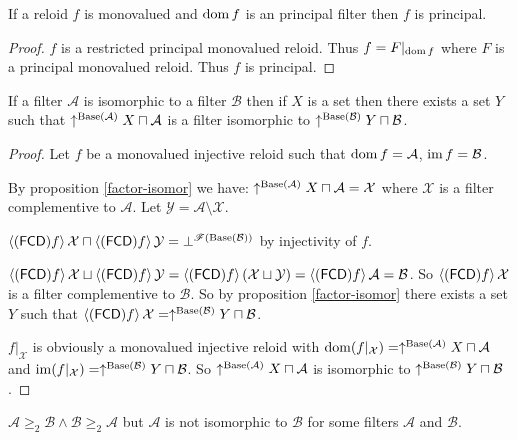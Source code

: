 \begin{thm}
If a reloid $f$ is monovalued and $\operatorname{dom} f$ is an principal filter
then $f$ is principal.\end{thm}
\begin{proof}
$f$ is a restricted principal monovalued reloid. Thus $f=F|_{\operatorname{dom} f}$
where $F$ is a principal monovalued reloid. Thus $f$ is principal.\end{proof}
\begin{lem}
If a filter $\mathcal{A}$ is isomorphic to a filter $\mathcal{B}$
then if $X$ is a set then there exists a set $Y$ such that $\uparrow^{\operatorname{Base}(\mathcal{A})}X\sqcap\mathcal{A}$
is a filter isomorphic to $\uparrow^{\operatorname{Base}(\mathcal{B})}Y\sqcap\mathcal{B}$.\end{lem}
\begin{proof}
Let $f$ be a monovalued injective reloid such that $\operatorname{dom} f=\mathcal{A}$,
$\operatorname{im} f=\mathcal{B}$.

By proposition \ref{factor-isomor} we have: $\uparrow^{\operatorname{Base}(\mathcal{A})}X\sqcap\mathcal{A}=\mathcal{X}$
where $\mathcal{X}$ is a filter complementive to $\mathcal{A}$.
Let $\mathcal{Y}=\mathcal{A}\setminus\mathcal{X}$.

$\left\langle (\mathsf{FCD}) f\right\rangle\mathcal{X}\sqcap\left\langle (\mathsf{FCD}) f\right\rangle\mathcal{Y}=\bot^{\mathscr{F}(\operatorname{Base}(\mathcal{B}))}$
by injectivity of $f$.

$\left\langle (\mathsf{FCD}) f\right\rangle\mathcal{X}\sqcup\left\langle (\mathsf{FCD}) f\right\rangle\mathcal{Y}=\left\langle (\mathsf{FCD}) f\right\rangle(\mathcal{X}\sqcup\mathcal{Y})=\left\langle (\mathsf{FCD}) f\right\rangle\mathcal{A}=\mathcal{B}$.
So $\left\langle (\mathsf{FCD}) f\right\rangle\mathcal{X}$ is a filter complementive to $\mathcal{B}$.
So by proposition \ref{factor-isomor} there exists a set $Y$ such
that $\left\langle (\mathsf{FCD}) f\right\rangle\mathcal{X}=\uparrow^{\operatorname{Base}(\mathcal{B})}Y\sqcap\mathcal{B}$.

$f|_{\mathcal{X}}$ is obviously a monovalued injective reloid with
$\operatorname{dom}(f|_{\mathcal{X}})=\uparrow^{\operatorname{Base}(\mathcal{A})}X\sqcap\mathcal{A}$
and $\operatorname{im}(f|_{\mathcal{X}})=\uparrow^{\operatorname{Base}(\mathcal{B})}Y\sqcap\mathcal{B}$.
So $\uparrow^{\operatorname{Base}(\mathcal{A})}X\sqcap\mathcal{A}$ is isomorphic
to $\uparrow^{\operatorname{Base}(\mathcal{B})}Y\sqcap\mathcal{B}$.\end{proof}
\begin{example}
$\mathcal{A}\ge_{2}\mathcal{B}\wedge\mathcal{B}\ge_{2}\mathcal{A}$
but $\mathcal{A}$ is not isomorphic to $\mathcal{B}$ for some filters
$\mathcal{A}$ and $\mathcal{B}$.\end{example}
